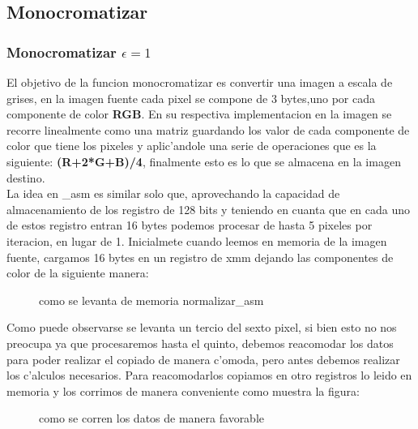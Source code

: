 \subsection{Monocromatizar}
\subsubsection{Monocromatizar $\epsilon = 1$ }
El objetivo de la funcion monocromatizar es convertir una imagen a escala de grises, en la imagen fuente
cada pixel se compone de 3 bytes,uno por cada componente de color \textbf{RGB}. En su respectiva implementacion en 
\newcolumntype{C} la imagen se recorre linealmente como  una matriz guardando los valor de cada componente de color
que tiene los pixeles y aplic'andole una serie de operaciones que es la siguiente:
\textbf{(R+2*G+B)/4}, finalmente esto es lo que se almacena en la imagen destino.\\
La idea en \_asm es similar solo que, aprovechando la capacidad de almacenamiento de los registro de 128 bits
y teniendo en cuanta que en cada uno de estos registro entran 16 bytes podemos procesar de hasta 5 pixeles
por iteracion, en lugar de 1.
Inicialmete cuando leemos en memoria de la imagen fuente, cargamos 16 bytes en un registro de xmm dejando 
las componentes de color de la siguiente manera: \\
\begin{figure}[hb]
\caption{como se levanta de memoria normalizar\_asm}
\label{est:m-uno}
\end{figure}
Como puede observarse se levanta un tercio del sexto pixel, si bien esto no nos preocupa ya que procesaremos
hasta el quinto, debemos reacomodar los datos para poder realizar el copiado de manera c'omoda, pero
antes debemos realizar los c'alculos necesarios. Para reacomodarlos  copiamos en otro registros
lo leido en memoria y los corrimos de manera conveniente como muestra la figura: \\
\begin{figure}[hb]
\caption{como se corren los datos de manera favorable}
\label{est:m-uno}
\end{figure}

